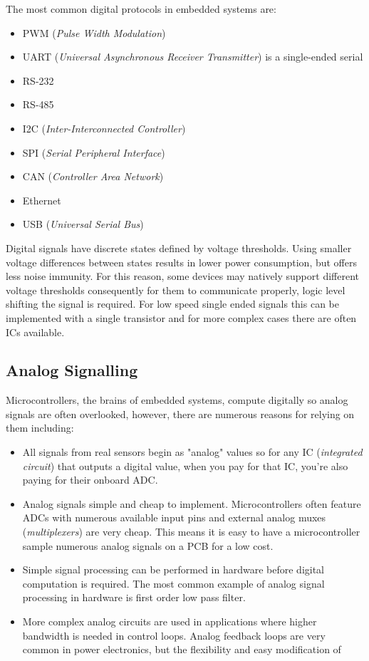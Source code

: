 \documentclass[main.tex]{subfiles}
\begin{document}
The most common digital protocols in embedded systems are:
\begin{itemize} %
    \item PWM (\textit{Pulse Width Modulation})
    \item UART (\textit{Universal Asynchronous Receiver Transmitter}) is a single-ended serial
    \item RS-232
    \item RS-485 
    \item I2C (\textit{Inter-Interconnected Controller})
    \item SPI (\textit{Serial Peripheral Interface})
    \item CAN (\textit{Controller Area Network})
    \item Ethernet 
    \item USB (\textit{Universal Serial Bus})
\end{itemize}

Digital signals have discrete states defined by voltage thresholds. Using smaller voltage differences between states results in lower power consumption, but offers less noise immunity. For this reason, some devices may natively support different voltage thresholds consequently for them to communicate properly, logic level shifting the signal is required. For low speed single ended signals this can be implemented with a single transistor and for more complex cases there are often ICs available. 


\subsection{Analog Signalling}

Microcontrollers, the brains of embedded systems, compute digitally so analog signals are often overlooked, however, there are numerous reasons for relying on them including: 
\begin{itemize}
    \item All signals from real sensors begin as "analog" values so for any IC (\textit{integrated circuit}) that outputs a digital value, when you pay for that IC, you're also paying for their onboard ADC.
    \item Analog signals simple and cheap to implement. Microcontrollers often feature ADCs with numerous available input pins and external analog muxes (\textit{multiplexers}) are very cheap. This means it is easy to have a microcontroller sample numerous analog signals on a PCB for a low cost.
    \item Simple signal processing can be performed in hardware before digital computation is required. The most common example of analog signal processing in hardware is first order low pass filter. 
    \item More complex analog circuits are used in applications where higher bandwidth is needed in control loops. Analog feedback loops are very common in power electronics, but the flexibility and easy modification of 
\end{itemize}


\end{document}
